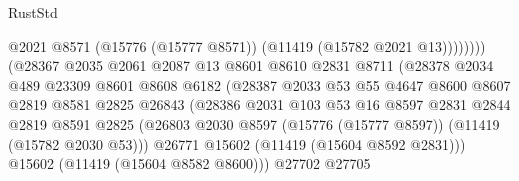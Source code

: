 \begin{lexlean}{RustStd}
\begin{coremodule}
                                              @2021
                                              @8571
                                              (@15776 (@15777 @8571))
                                              (@11419 (@15782 @2021 @13))))))))
                                  (@28367
                                    @2035
                                    @2061
                                    @2087
                                    @13
                                    @8601
                                    @8610
                                    @2831
                                    @8711
                                    (@28378
                                      @2034
                                      @489
                                      @23309
                                      @8601
                                      @8608
                                      @6182
                                      (@28387
                                        @2033
                                        @53
                                        @55
                                        @4647
                                        @8600
                                        @8607
                                        @2819
                                        @8581
                                        @2825
                                        @26843
                                        (@28386
                                          @2031
                                          @103
                                          @53
                                          @16
                                          @8597
                                          @2831
                                          @2844
                                          @2819
                                          @8591
                                          @2825
                                          (@26803
                                            @2030
                                            @8597
                                            (@15776 (@15777 @8597))
                                            (@11419 (@15782 @2030 @53)))
                                          @26771
                                          @15602
                                          (@11419 (@15604 @8592 @2831)))
                                        @15602
                                        (@11419 (@15604 @8582 @8600)))
                                      @27702
                                      @27705

\end{coremodule}
\end{lexlean}
